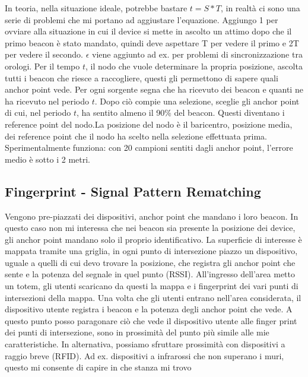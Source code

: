 \documentclass[12pt,italian]{report}
\begin{document}
In teoria, nella situazione ideale, potrebbe bastare $t = S*T$, in realtà ci sono una serie di problemi che mi portano ad aggiustare l'equazione. Aggiungo 1 per ovviare alla situazione in cui il device si mette in ascolto un attimo dopo che il primo beacon è stato mandato, quindi deve aspettare T per vedere il primo e 2T per vedere il secondo. $\epsilon$ viene aggiunto ad ex. per problemi di sincronizzazione tra orologi. 
\bigbreak
Per il tempo $t$, il nodo che vuole determinare la propria posizione, ascolta tutti i beacon che riesce a raccogliere, questi gli permettono di sapere quali anchor point vede. Per ogni sorgente segna che ha ricevuto dei beacon e quanti ne ha ricevuto nel periodo $t$. Dopo ciò compie una selezione, sceglie gli anchor point di cui, nel periodo $t$, ha sentito almeno il 90\% del beacon. Questi diventano i reference point del nodo.La posizione del nodo è il baricentro, posizione media, dei reference point che il nodo ha scelto nella selezione effettuata prima.
\bigbreak
Sperimentalmente funziona: con 20 campioni sentiti dagli anchor point, l'errore medio è sotto i 2 metri. 

\subsection{Fingerprint - Signal Pattern Rematching}
Vengono pre-piazzati dei dispositivi, anchor point che mandano i loro beacon. In questo caso non mi interessa che nei beacon sia presente la posizione dei device, gli anchor point mandano solo il proprio identificativo. 
\bigbreak
La superficie di interesse è mappata tramite una griglia, in ogni punto di intersezione piazzo un dispositivo, uguale a quelli di cui devo trovare la posizione, che registra gli anchor point che sente e la potenza del segnale in quel punto (RSSI). All'ingresso dell'area metto un totem, gli utenti scaricano da questi la mappa e i fingerprint dei vari punti di intersezioni della mappa. Una volta che gli utenti entrano nell'area considerata, il dispositivo utente registra i beacon e la potenza degli anchor point che vede. A questo punto posso paragonare ciò che vede il dispositivo utente alle finger print dei punti di intersezione, sono in prossimità del punto più simile alle mie caratteristiche. 
\bigbreak
\noindent In alternativa, possiamo sfruttare prossimità con dispositivi a raggio breve (RFID). Ad ex. dispositivi a infrarossi che non superano i muri, questo mi consente di capire in che stanza mi trovo
\end{document}
